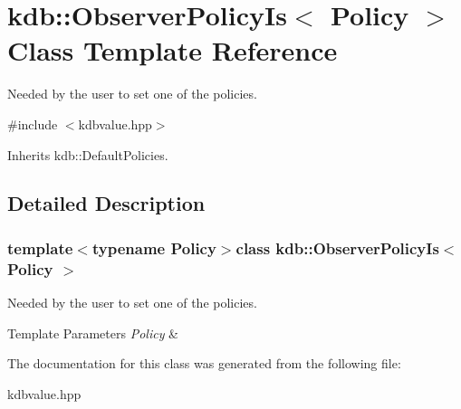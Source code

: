 \hypertarget{classkdb_1_1ObserverPolicyIs}{\section{kdb\-:\-:Observer\-Policy\-Is$<$ Policy $>$ Class Template Reference}
\label{classkdb_1_1ObserverPolicyIs}
}


Needed by the user to set one of the policies.  




{\ttfamily \#include $<$kdbvalue.\-hpp$>$}



Inherits kdb\-::\-Default\-Policies.



\subsection{Detailed Description}
\subsubsection*{template$<$typename Policy$>$class kdb\-::\-Observer\-Policy\-Is$<$ Policy $>$}

Needed by the user to set one of the policies. 


\begin{DoxyTemplParams}{Template Parameters}
{\em Policy} & \\
\hline
\end{DoxyTemplParams}


The documentation for this class was generated from the following file\-:\begin{DoxyCompactItemize}
\item 
kdbvalue.\-hpp\end{DoxyCompactItemize}
